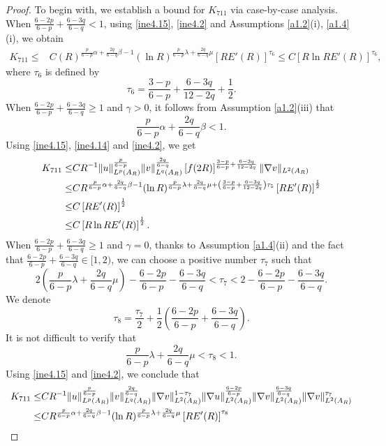 \documentclass[11pt,reqno]{amsart}
\numberwithin{Thm}{section}
\begin{document}
\begin{proof}
To begin with, we establish a bound for $K_{711}$ via case-by-case analysis.
When $\frac{6-2p}{6-p} + \frac{6-3q}{6-q} < 1$, using \eqref{ine4.15}, \eqref{ine4.2} and Assumptions \ref{a1.2}(i), \ref{a1.4}(i), we obtain
\begin{align}\label{ine4.38}
	K_{711} \leq &C(R)^{\frac{p}{6-p}\alpha+\frac{2q}{6-q}\beta-1}(\ln R)^{\frac{p}{6-p}\lambda+\frac{2q}{6-q}\mu}\left[R E'(R)\right]^{\tau_6}\leq C\left[R \ln R E'(R)\right]^{\tau_6},
\end{align}
where $\tau_6$ is defined by
$$
\tau_6=\frac{3-p}{6-p}+\frac{6-3q}{12-2q}+\frac{1}{2}.
$$
When $\frac{6-2p}{6-p} + \frac{6-3q}{6-q}\geq1$ and $\gamma>0$, it follows from Assumption \ref{a1.2}(iii) that
$$
\frac{p}{6-p}\alpha+\frac{2q}{6-q}\beta<1.
$$
Using \eqref{ine4.15}, \eqref{ine4.14} and \eqref{ine4.2}, we get
\begin{align}\label{ine4.39}
K_{711} \leq&C R^{-1} \|u\|_{L^p(A_R)}^{\frac{p}{6-p}}\|v\|_{L^q(A_R)}^{\frac{2q}{6-q}}\left[f(2R)\right]^{\frac{3-p}{6-p}+\frac{6-3q}{12-2q}}\|\nabla v\|_{L^2(A_R)}\notag\\
\leq&C R^{\frac{p}{6-p}\alpha+\frac{2q}{6-q}\beta-1}(\ln R)^{\frac{p}{6-p}\lambda+\frac{2q}{6-q}\mu+\left(\frac{3-p}{6-p}+\frac{6-3q}{12-2q}\right)\tau_5} \left[RE'(R)\right]^{\frac{1}{2}}\notag\\
\leq&C\left[RE'(R)\right]^{\frac{1}{2}}\\
\leq&C\left[R\ln RE'(R)\right]^{\frac{1}{2}}.\notag
\end{align}
When $\frac{6-2p}{6-p} + \frac{6-3q}{6-q}\geq1$ and $\gamma=0$, thanks to Assumption \ref{a1.4}(ii) and the fact that $\frac{6-2p}{6-p} + \frac{6-3q}{6-q}\in[1,2)$, we can choose a positive number
$\tau_7$ such that
$$
2\left(\frac{p}{6-p}\lambda+\frac{2q}{6-q}\mu\right)-\frac{6-2p}{6-p}-\frac{6-3q}{6-q}<\tau_7<2-\frac{6-2p}{6-p} -\frac{6-3q}{6-q}.
$$
We denote
$$
\tau_8=\frac{\tau_7}{2}+\frac{1}{2}\left(\frac{6-2p}{6-p} + \frac{6-3q}{6-q}\right).
$$
It is not difficult to verify that
$$
\frac{p}{6-p}\lambda+\frac{2q}{6-q}\mu<\tau_8<1.
$$
Using \eqref{ine4.15} and \eqref{ine4.2}, we conclude that
\begin{align}\label{ine4.40}
K_{711} \leq&C R^{-1} \|u\|_{L^p(A_R)}^{\frac{p}{6-p}}\|v\|_{L^q(A_R)}^{\frac{2q}{6-q}}\|\nabla v\|_{L^2(A_R)}^{1-\tau_7}\|\nabla u\|_{L^2(A_R)}^{\frac{6-2p}{6-p}}\|\nabla v\|_{L^2(A_R)}^{\frac{6-3q}{6-q}}\|\nabla v\|_{L^2(A_R)}^{\tau_7}\notag\\
\leq&C R^{\frac{p}{6-p}\alpha+\frac{2q}{6-q}\beta-1}(\ln R)^{\frac{p}{6-p}\lambda+\frac{2q}{6-q}\mu} \left[RE'(R)\right]^{\tau_8}\\

\end{align}
\end{proof}
\end{document}
